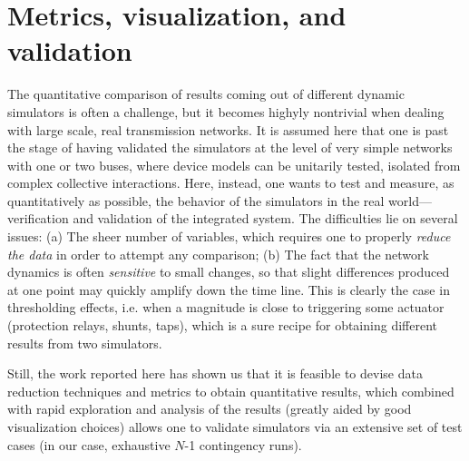 \documentclass[conference]{IEEEtran}
\begin{document}
\section{Metrics, visualization, and validation}
\label{sec:metrics}

The quantitative comparison of results coming out of different dynamic
simulators is often a challenge, but it becomes highyly nontrivial
when dealing with large scale, real transmission networks. It is
assumed here that one is past the stage of having validated the
simulators at the level of very simple networks with one or two buses,
where device models can be unitarily tested, isolated from complex
collective interactions. Here, instead, one wants to test and measure,
as quantitatively as possible, the behavior of the simulators in the
real world---verification and validation of the integrated system.
The difficulties lie on several issues: (a) The sheer number of
variables, which requires one to properly \emph{reduce the data} in
order to attempt any comparison; (b) The fact that the network
dynamics is often \emph{sensitive} to small changes, so that slight
differences produced at one point may quickly amplify down the time
line. This is clearly the case in thresholding effects, i.e. when a
magnitude is close to triggering some actuator (protection relays,
shunts, taps), which is a sure recipe for obtaining different results
from two simulators.

Still, the work reported here has shown us that it is feasible to
devise data reduction techniques and metrics to obtain quantitative
results, which combined with rapid exploration and analysis of
the results (greatly aided by good visualization choices) allows one to
validate simulators via an extensive set of test cases (in our case,
exhaustive $N$-1 contingency runs).
\end{document}
